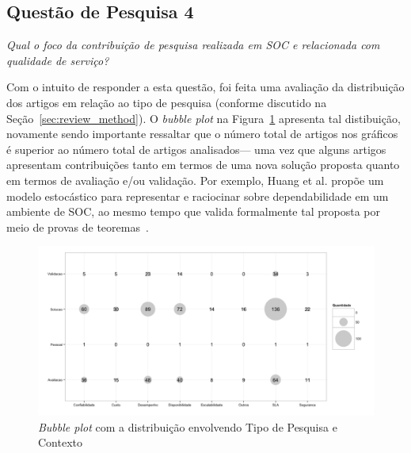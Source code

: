 \subsection{Questão de Pesquisa 4}

\emph{Qual o foco da contribuição de pesquisa realizada em SOC e relacionada com qualidade de serviço? }

Com o intuito de responder a esta questão, foi feita uma avalia\c c\~{a}o da distribui\c c\~{a}o dos 
artigos em rela\c c\~{a}o ao tipo de pesquisa (conforme discutido na Se\c c\~{a}o~\ref{sec:review_method}). 
O \emph{bubble plot} na Figura~\ref{fig:bubbleplot-QoSRes}  apresenta tal distibui\c c\~{a}o, novamente sendo importante ressaltar que o n\'{u}mero total de artigos nos gr\'{a}ficos \'{e} superior ao n\'{u}mero total de artigos analisados--- uma vez que alguns artigos apresentam contribui\c c\~{o}es tanto em termos de uma nova solu\c c\~{a}o proposta quanto em termos de avalia\c c\~{a}o e/ou valida\c c\~{a}o. Por exemplo, Huang et al. prop\~{o}e um modelo estoc\'{a}stico para representar e raciocinar sobre dependabilidade em um ambiente de SOC, ao mesmo tempo que valida formalmente tal proposta por meio de provas de teoremas~\cite{huang:scc2011}.

\begin{figure}[htb]
\centering
\includegraphics[scale=0.5]{imagens/pesquisaContexto.pdf}
\caption{\emph{Bubble plot} com a distribui\c{c}\~{a}o envolvendo Tipo de Pesquisa e Contexto}
\label{fig:bubbleplot-QoSRes}
\end{figure}

